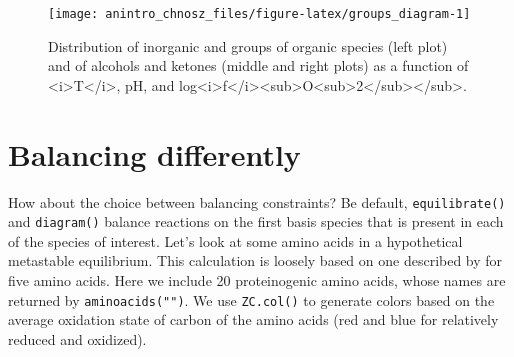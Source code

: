 \documentclass[]{tufte-book}
\newenvironment{Shaded}{}{}
\newcommand{\KeywordTok}[1]{\textcolor[rgb]{0.00,0.44,0.13}{\textbf{#1}}}
\newcommand{\DataTypeTok}[1]{\textcolor[rgb]{0.56,0.13,0.00}{#1}}
\newcommand{\DecValTok}[1]{\textcolor[rgb]{0.25,0.63,0.44}{#1}}
\newcommand{\FloatTok}[1]{\textcolor[rgb]{0.25,0.63,0.44}{#1}}
\newcommand{\StringTok}[1]{\textcolor[rgb]{0.25,0.44,0.63}{#1}}
\newcommand{\CommentTok}[1]{\textcolor[rgb]{0.38,0.63,0.69}{\textit{#1}}}
\newcommand{\OtherTok}[1]{\textcolor[rgb]{0.00,0.44,0.13}{#1}}
\newcommand{\OperatorTok}[1]{\textcolor[rgb]{0.40,0.40,0.40}{#1}}
\newcommand{\NormalTok}[1]{#1}
\begin{document}
\begin{Shaded}
\end{Shaded}

\begin{figure}
\texttt{[image: anintro\_chnosz\_files/figure-latex/groups\_diagram-1]} \caption[Distribution of inorganic and groups of organic species (left plot) and of alcohols and ketones (middle and right plots) as a function of <i>T</i>, pH, and log<i>f</i><sub>O<sub>2</sub></sub>]{Distribution of inorganic and groups of organic species (left plot) and of alcohols and ketones (middle and right plots) as a function of <i>T</i>, pH, and log<i>f</i><sub>O<sub>2</sub></sub>.}\label{fig:groups_diagram}
\end{figure}

\section{Balancing differently}\label{balancing-differently}

How about the choice between balancing constraints? Be default,
{\texttt{equilibrate()}} and {\texttt{diagram()}} balance reactions on
the first basis species that is present in each of the species of
interest. Let's look at some amino acids in a hypothetical metastable
equilibrium. This calculation is loosely based on one described by
\citet{Sho90b} for five amino acids. Here we include 20 proteinogenic
amino acids, whose names are returned by {\texttt{aminoacids("")}}. We
use {\texttt{ZC.col()}} to generate colors based on the average
oxidation state of carbon of the amino acids (red and blue for
relatively reduced and oxidized).
\end{document}
